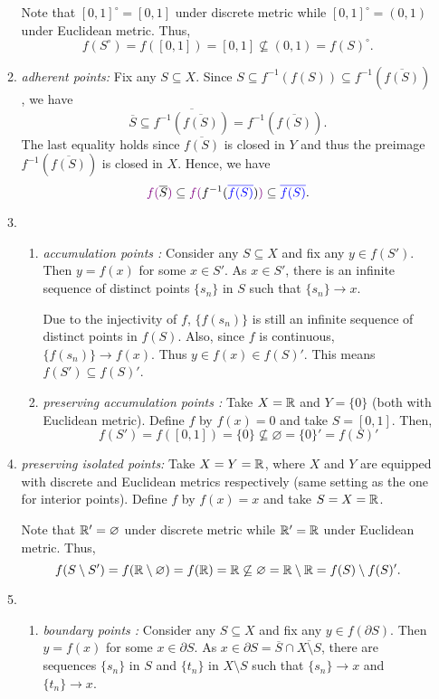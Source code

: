 \begin{enumerate}
\begin{enumerate}
Note that \([0,1]^{\circ}=[0,1]\) under discrete metric while
\([0,1]^{\circ}=(0,1)\) under Euclidean metric. Thus,
\[
f(S^{\circ})=f([0,1])=[0,1]\not\subseteq (0,1)=f(S)^{\circ}.
\]
\item \emph{ adherent points:} Fix any \(S\subseteq X\). Since
\(S\subseteq f^{-1}(f(S))\subseteq f^{-1}(\overline{f(S)})\), we have
\[
\overline{S}\subseteq
\overline{f^{-1}(\overline{f(S)})}=f^{-1}(\overline{f(S)}).
\]
The last equality holds since \(\overline{f(S)}\) is closed in \(Y\) and thus
the preimage \(f^{-1}(\overline{f(S)})\) is closed in \(X\). Hence, we have
\[
{\color{violet}f(}\overline{S}{\color{violet})}\subseteq
{\color{violet}f(}f^{-1}({\color{blue}\overline{f(S)}}){\color{violet})}
\subseteq {\color{blue}\overline{f(S)}}.
\]
\item 
\begin{enumerate}
\item \emph{ accumulation points :}
Consider any \(S\subseteq X\) and fix any \(y\in f(S')\). Then \(y=f(x)\) for
some \(x\in S'\). As \(x\in S'\), there is an infinite sequence of distinct
points \(\{s_n\}\) in \(S\) such that \(\{s_n\}\to x\).

Due to the injectivity of \(f\), \(\{f(s_n)\}\) is still an infinite sequence
of distinct points in \(f(S)\). Also, since \(f\) is continuous,
\(\{f(s_n)\}\to f(x)\).  Thus \(y\in f(x)\in f(S)'\). This means
\(f(S')\subseteq f(S)'\).
\item \emph{ preserving accumulation points :} Take \(X=\mathbb{R}\)
and \(Y=\{0\}\) (both with Euclidean metric). Define \(f\) by \(f(x)=0\) and
take \(S=[0,1]\). Then,
\[
f(S')=f([0,1])=\{0\}\not\subseteq \varnothing=\{0\}'=f(S)'
\]
\end{enumerate}
\item \emph{ preserving isolated points:} Take \(X=Y=\mathbb{R}\), where \(X\) and
\(Y\) are equipped with discrete and Euclidean metrics respectively (same
setting as the one for interior points). Define \(f\) by \(f(x)=x\) and take
\(S=X=\mathbb{R}\).

Note that \(\mathbb{R}'=\varnothing\) under discrete metric while \(\mathbb{R}'=\mathbb{R}\) under
Euclidean metric. Thus,
\[
f(S\setminus S')=f(\mathbb{R}\setminus\varnothing)=f(\mathbb{R})=\mathbb{R}\not\subseteq 
\varnothing=\mathbb{R}\setminus \mathbb{R}=f(S)\setminus f(S)'.
\]
\item \begin{enumerate}
\item \emph{ boundary points :}
Consider any \(S\subseteq X\) and fix any \(y\in f(\partial S)\). Then
\(y=f(x)\) for some \(x\in \partial S\). As \(x\in \partial
S=\overline{S}\cap\overline{X\setminus S}\), there are sequences \(\{s_n\}\) in
\(S\) and \(\{t_n\}\) in \(X\setminus S\) such that \(\{s_n\}\to x\) and
\(\{t_n\}\to x\).


\end{enumerate}
\end{enumerate}
\end{enumerate}
